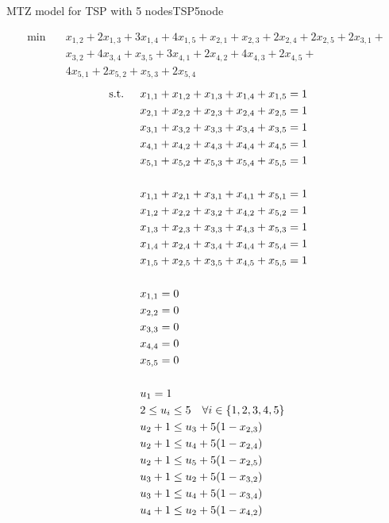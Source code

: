 \begin{example}{MTZ model for TSP with 5 nodes}{TSP5node}

\begin{align*}\min\quad & x_{1,2} + 2 x_{1,3} + 3 x_{1,4} + 4 x_{1,5} + x_{2,1} + x_{2,3} + 2 x_{2,4} + 2 x_{2,5} + 2 x_{3,1} + \\&x_{3,2} + 4 x_{3,4} + x_{3,5} + 3 x_{4,1} + 2 x_{4,2} + 4 x_{4,3} + 2 x_{4,5} + \\&4 x_{5,1} + 2 x_{5,2} + x_{5,3} + 2 x_{5,4}
\end{align*}
\begin{align*}
\st \quad
 & x_{1,1} + x_{1,2} + x_{1,3} + x_{1,4} + x_{1,5} = 1\\
 & x_{2,1} + x_{2,2} + x_{2,3} + x_{2,4} + x_{2,5} = 1\\
 & x_{3,1} + x_{3,2} + x_{3,3} + x_{3,4} + x_{3,5} = 1\\
 & x_{4,1} + x_{4,2} + x_{4,3} + x_{4,4} + x_{4,5} = 1\\
 & x_{5,1} + x_{5,2} + x_{5,3} + x_{5,4} + x_{5,5} = 1\\
 \\
&x_{1,1} + x_{2,1} + x_{3,1} + x_{4,1} + x_{5,1} = 1\\
 & x_{1,2} + x_{2,2} + x_{3,2} + x_{4,2} + x_{5,2} = 1\\
 & x_{1,3} + x_{2,3} + x_{3,3} + x_{4,3} + x_{5,3} = 1\\
 & x_{1,4} + x_{2,4} + x_{3,4} + x_{4,4} + x_{5,4} = 1\\
 & x_{1,5} + x_{2,5} + x_{3,5} + x_{4,5} + x_{5,5} = 1\\
\\
 & x_{1,1} = 0\\
 & x_{2,2} = 0\\
 & x_{3,3} = 0\\
 & x_{4,4} = 0\\
 & x_{5,5} = 0\\
 \\
 & u_{1} = 1\\
 & 2 \leq u_{i} \leq 5 \quad\forall i \in \{1,2,3,4,5\}\\
 & u_{2} +1 \leq u_{3} + 5 (1-x_{2,3})\\
 & u_{2} +1 \leq u_{4} + 5  (1-x_{2,4})\\
  & u_{2} +1 \leq  u_{5} + 5 (1-x_{2,5} )\\
 & u_{3} +1 \leq u_{2} + 5  (1-x_{3,2})\\
 & u_{3} +1 \leq u_{4} + 5  (1-x_{3,4})\\
 & u_{4} +1 \leq u_{2} + 5  (1-x_{4,2})\\

\end{align*}
\end{example}
